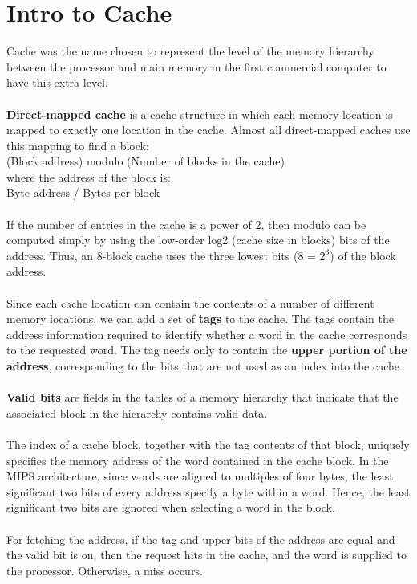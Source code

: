 \documentclass[letterpaper,c12pt]{article}
\begin{document}
\section{Intro to Cache}
Cache was the name chosen to represent the level of the memory hierarchy between the processor and main memory in the first commercial computer to have this extra level.\\\\
\textbf{Direct-mapped cache} is a cache structure in which each memory location is mapped to exactly one location in the cache. Almost all direct-mapped caches use this mapping to find a block:\\
(Block address) modulo (Number of blocks in the cache)\\
where the address of the block is:\\
Byte address / Bytes per block\\\\
If the number of entries in the cache is a power of 2, then modulo can be computed simply by using the low-order log2 (cache size in blocks) bits of the address. Thus, an 8-block cache uses the three lowest bits (8 = $2^3$) of the block address. \\\\
Since each cache location can contain the contents of a number of different memory locations, we can add a set of \textbf{tags} to the cache. The tags contain the address information required to identify whether a word in the cache corresponds to the requested word. The tag needs only to contain the \textbf{upper portion of the address}, corresponding to the bits that are not used as an index into the cache.\\\\
\textbf{Valid bits} are fields in the tables of a memory hierarchy that indicate that the associated block in the hierarchy contains valid data.\\\\
The index of a cache block, together with the tag contents of that block, uniquely specifies the memory address of the word contained in the cache block. In the MIPS architecture, since words are aligned to multiples of four bytes, the least significant two bits of every address specify a byte within a word. Hence, the least significant two bits are ignored when selecting a word in the block.\\\\
For fetching the address, if the tag and upper bits of the address are equal and the valid bit is on, then the request hits in the cache, and the word is supplied to the processor. Otherwise, a miss occurs.\\\\
\end{document}

